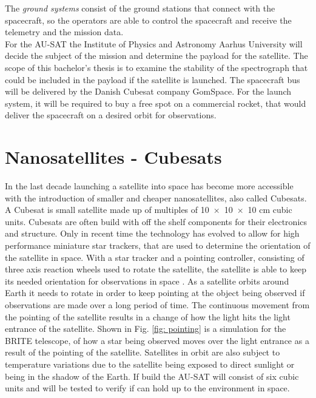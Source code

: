 The \emph{ground systems} consist of the ground stations that connect with the spacecraft, so the operators are able to control the spacecraft and receive the 	telemetry and the mission data. 
\\

For the AU-SAT the Institute of Physics and Astronomy Aarhus University will decide the subject of the mission and determine the payload for the satellite. The scope of this bachelor's thesis is to examine the stability of the spectrograph that could be included in the payload if the satellite is launched. The spacecraft bus will be delivered by the Danish Cubesat company GomSpace. For the launch system, it will be required to buy a free spot on a commercial rocket, that would deliver the spacecraft on a desired orbit for observations. 

\section{Nanosatellites - Cubesats}
\label{satellite}
In the last decade launching a satellite into space has become more accessible with the introduction of smaller and cheaper nanosatellites, also called Cubesats. A Cubesat is small satellite made up of multiples of \num{10 x 10 x 10} \si{\centi\meter} cubic units. Cubesats are often build with off the shelf components for their electronics	 and structure. Only in recent time the technology has evolved to allow for high performance miniature star trackers, that are used to determine the orientation of the satellite in space. With a star tracker and a pointing controller, consisting of three axis reaction wheels used to rotate the satellite, the satellite is able to keep its needed orientation for observations in space \citep{brite}. As a satellite orbits around Earth it needs to rotate in order to keep pointing at the object being observed if observations are made over a long period of time. The continuous movement from the pointing of the satellite results in a change of how the light hits the light entrance of the satellite. Shown in Fig. \ref{fig: pointing} is a simulation for the BRITE telescope, of how a star being observed moves over the light entrance as a result of the pointing of the satellite. 
Satellites in orbit are also subject to temperature variations due to the satellite being exposed to direct sunlight or being in the shadow of the Earth. If build the AU-SAT will consist of six cubic units and will be tested to verify if can hold up to the environment in space.

